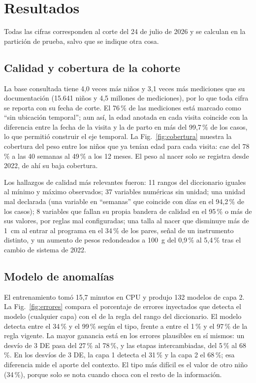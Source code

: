 \section{Resultados}
\label{sec:resultados}

Todas las cifras corresponden al corte del 24 de julio de 2026 y se calculan en la partición de prueba, salvo que se indique otra cosa.

\subsection{Calidad y cobertura de la cohorte}
\label{sec:res-datos}
La base consultada tiene 4,0 veces más niños y 3,1 veces más mediciones que su documentación (15.641 niños y 4,5 millones de mediciones), por lo que toda cifra se reporta con su fecha de corte. El 76\,\% de las mediciones está marcado como ``sin ubicación temporal''; aun así, la edad anotada en cada visita coincide con la diferencia entre la fecha de la visita y la de parto en más del 99,7\,\% de los casos, lo que permitió construir el eje temporal. La Fig.~\ref{fig:cobertura} muestra la cobertura del peso entre los niños que ya tenían edad para cada visita: cae del 78\,\% a las 40 semanas al 49\,\% a los 12 meses. El peso al nacer solo se registra desde 2022, de ahí su baja cobertura.



Los hallazgos de calidad más relevantes fueron: 11 rangos del diccionario iguales al mínimo y máximo observados; 37 variables numéricas sin unidad; una unidad mal declarada (una variable en ``semanas'' que coincide con días en el 94,2\,\% de los casos); 8 variables que fallan su propia bandera de calidad en el 95\,\% o más de sus valores, por reglas mal configuradas; una talla al nacer que disminuye más de 1~cm al entrar al programa en el 34\,\% de los pares, señal de un instrumento distinto, y un aumento de pesos redondeados a 100~g del 0,9\,\% al 5,4\,\% tras el cambio de sistema de 2022.

\subsection{Modelo de anomalías}
\label{sec:res-anomalias}
El entrenamiento tomó 15,7 minutos en CPU y produjo 132 modelos de capa 2. La Fig.~\ref{fig:errores} compara el porcentaje de errores inyectados que detecta el modelo (cualquier capa) con el de la regla del rango del diccionario. El modelo detecta entre el 34\,\% y el 99\,\% según el tipo, frente a entre el 1\,\% y el 97\,\% de la regla vigente. La mayor ganancia está en los errores plausibles en sí mismos: un desvío de 3 DE pasa del 27\,\% al 78\,\%, y las etapas intercambiadas, del 5\,\% al 68\,\%. En los desvíos de 3 DE, la capa 1 detecta el 31\,\% y la capa 2 el 68\,\%; esa diferencia mide el aporte del contexto. El tipo más difícil es el valor de otro niño (34\,\%), porque solo se nota cuando choca con el resto de la información.

